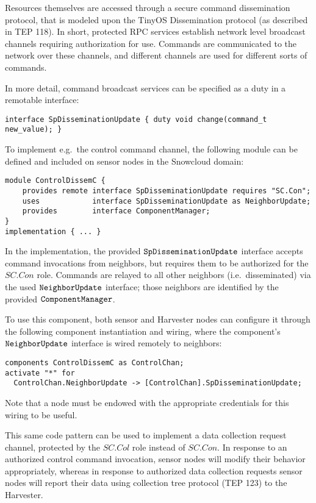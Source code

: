 Resources themselves are accessed through a secure command
dissemination protocol, that is modeled upon the TinyOS Dissemination
protocol (as described in TEP 118). In short, protected RPC services
establish network level broadcast channels requiring authorization for
use. Commands are communicated to the network over these channels, and
different channels are used for different sorts of commands. 

In more detail, command broadcast services can be specified as a duty
in a remotable interface:
\begin{Verbatim}
interface SpDisseminationUpdate { duty void change(command_t new_value); }
\end{Verbatim}
To implement e.g.~the control command channel, the following module
can be defined and included on sensor nodes in the Snowcloud domain:
\begin{Verbatim}
module ControlDissemC {
    provides remote interface SpDisseminationUpdate requires "SC.Con";
    uses            interface SpDisseminationUpdate as NeighborUpdate;
    provides        interface ComponentManager;
}
implementation { ... }
\end{Verbatim}
In the implementation, the provided $\verb+SpDisseminationUpdate+$
interface accepts command invocations from neighbors, but requires
them to be authorized for the $\mathit{SC.Con}$ role. Commands are
relayed to all other neighbors (i.e.~disseminated) via the used
$\verb+NeighborUpdate+$ interface; those neighbors are identified by
the provided $\verb+ComponentManager+$.

To use this component, both sensor and Harvester nodes can configure 
it through the following component instantiation and wiring, where 
the component's $\verb+NeighborUpdate+$ interface is wired remotely
to neighbors: 
\begin{Verbatim}
components ControlDissemC as ControlChan;
activate "*" for 
  ControlChan.NeighborUpdate -> [ControlChan].SpDisseminationUpdate;
\end{Verbatim}
Note that a node must be endowed with the appropriate credentials for
this wiring to be useful. 

This same code pattern can be used to implement a data collection
request channel, protected by the $\mathit{SC.Col}$ role instead of
$\mathit{SC.Con}$. In response to an authorized control command
invocation, sensor nodes will modify their behavior appropriately,
whereas in response to authorized data collection requests sensor
nodes will report their data using collection tree protocol (TEP 123)
to the Harvester.

